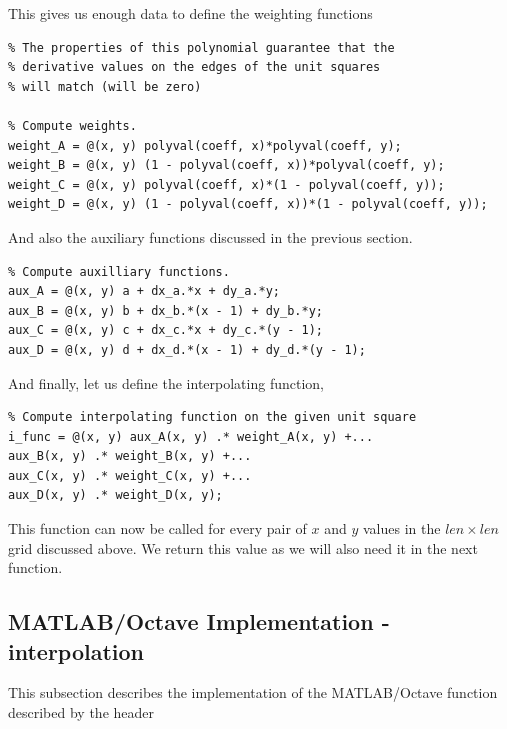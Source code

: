 \documentclass[fleqn]{article}
\begin{document}
This gives us enough data to define the weighting functions

\begin{small}
\begin{tcolorbox}
\begin{verbatim}
% The properties of this polynomial guarantee that the 
% derivative values on the edges of the unit squares 
% will match (will be zero)

% Compute weights.
weight_A = @(x, y) polyval(coeff, x)*polyval(coeff, y);
weight_B = @(x, y) (1 - polyval(coeff, x))*polyval(coeff, y);
weight_C = @(x, y) polyval(coeff, x)*(1 - polyval(coeff, y));
weight_D = @(x, y) (1 - polyval(coeff, x))*(1 - polyval(coeff, y));
\end{verbatim}
\end{tcolorbox}
\end{small}

And also the auxiliary functions discussed in the previous section.

\begin{tcolorbox}
\begin{verbatim}
% Compute auxilliary functions.
aux_A = @(x, y) a + dx_a.*x + dy_a.*y;
aux_B = @(x, y) b + dx_b.*(x - 1) + dy_b.*y;
aux_C = @(x, y) c + dx_c.*x + dy_c.*(y - 1);
aux_D = @(x, y) d + dx_d.*(x - 1) + dy_d.*(y - 1);
\end{verbatim}
\end{tcolorbox}

And finally, let us define the interpolating function,

\begin{tcolorbox}
\begin{verbatim}
% Compute interpolating function on the given unit square
i_func = @(x, y) aux_A(x, y) .* weight_A(x, y) +...
aux_B(x, y) .* weight_B(x, y) +...
aux_C(x, y) .* weight_C(x, y) +...
aux_D(x, y) .* weight_D(x, y);
\end{verbatim}
\end{tcolorbox}

This function can now be called for every pair of $x$ and $y$ values in the $len \times len$ grid discussed above. We return this value as we will also need it in the next function.

\subsection{MATLAB/Octave Implementation - interpolation}

This subsection describes the implementation of the MATLAB/Octave function described by the header
\end{document}
